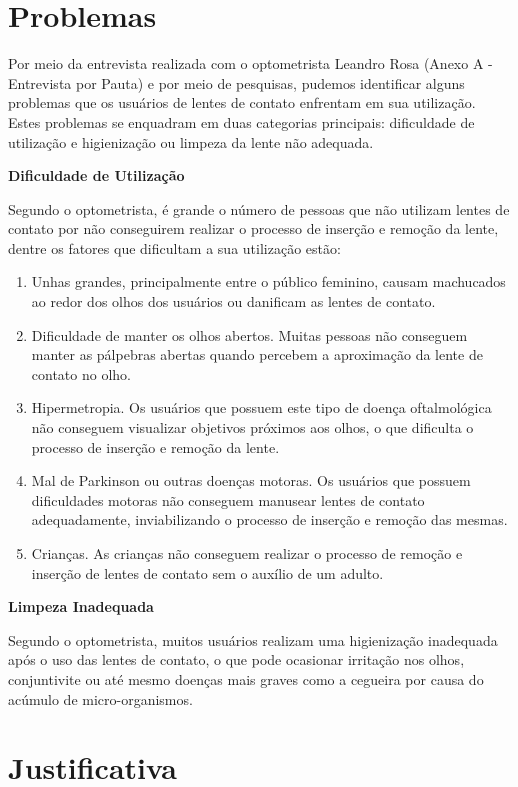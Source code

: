 \section[Problemas]{Problemas}

Por meio da entrevista realizada com o optometrista Leandro Rosa (Anexo A - Entrevista por Pauta) e por meio de pesquisas, pudemos identificar alguns problemas que os usuários de lentes de contato enfrentam em sua utilização. Estes problemas se enquadram em duas categorias principais: dificuldade de utilização e higienização ou limpeza da lente não adequada. 

\textbf{Dificuldade de Utilização}

Segundo o optometrista, é grande o número de pessoas que não utilizam lentes de contato por não conseguirem realizar o processo de inserção e remoção da lente, dentre os fatores que dificultam a sua utilização estão:

\begin{enumerate}
\item Unhas grandes, principalmente entre o público feminino, causam machucados ao redor dos olhos dos usuários ou danificam as lentes de contato.
\item Dificuldade de manter os olhos abertos. Muitas pessoas não conseguem manter as pálpebras abertas quando percebem a aproximação da lente de contato no olho.
\item Hipermetropia. Os usuários que possuem este tipo de doença oftalmológica não conseguem visualizar objetivos próximos aos olhos, o que dificulta o processo de inserção e remoção da lente.
\item Mal de Parkinson ou outras doenças motoras. Os usuários que possuem dificuldades motoras não conseguem manusear lentes de contato adequadamente, inviabilizando o processo de inserção e remoção das mesmas.
\item Crianças. As crianças não conseguem realizar o processo de remoção e inserção de lentes de contato sem o auxílio de um adulto. 
\end{enumerate}

\textbf{Limpeza Inadequada}

Segundo o optometrista, muitos usuários realizam uma higienização inadequada após o uso das lentes de contato, o que pode ocasionar irritação nos olhos, conjuntivite ou até mesmo doenças mais graves como a cegueira por causa do acúmulo de micro-organismos.

\section[Justificativa]{Justificativa}

